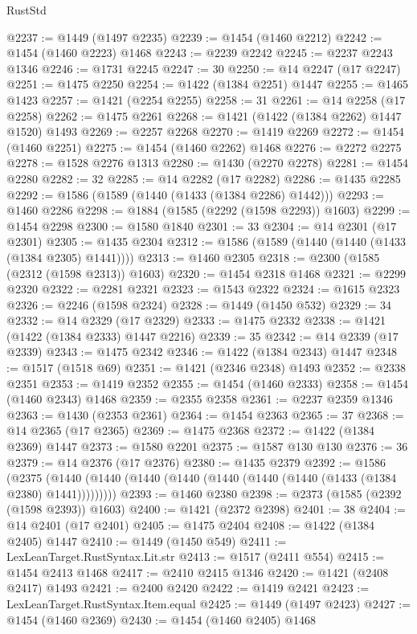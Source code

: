\begin{lexlean}{RustStd}
\begin{coremodule}
@2237 := @1449 (@1497 @2235)
@2239 := @1454 (@1460 @2212)
@2242 := @1454 (@1460 @2223) @1468
@2243 := @2239 @2242
@2245 := @2237 @2243 @1346
@2246 := @1731 @2245
@2247 := 30
@2250 := @14 @2247 (@17 @2247)
@2251 := @1475 @2250
@2254 := @1422 (@1384 @2251) @1447
@2255 := @1465 @1423
@2257 := @1421 (@2254 @2255)
@2258 := 31
@2261 := @14 @2258 (@17 @2258)
@2262 := @1475 @2261
@2268 := @1421 (@1422 (@1384 @2262) @1447 @1520) @1493
@2269 := @2257 @2268
@2270 := @1419 @2269
@2272 := @1454 (@1460 @2251)
@2275 := @1454 (@1460 @2262) @1468
@2276 := @2272 @2275
@2278 := @1528 @2276 @1313
@2280 := @1430 (@2270 @2278)
@2281 := @1454 @2280
@2282 := 32
@2285 := @14 @2282 (@17 @2282)
@2286 := @1435 @2285
@2292 := @1586 (@1589 (@1440 (@1433 (@1384 @2286) @1442)))
@2293 := @1460 @2286
@2298 := @1884 (@1585 (@2292 (@1598 @2293)) @1603)
@2299 := @1454 @2298
@2300 := @1580 @1840
@2301 := 33
@2304 := @14 @2301 (@17 @2301)
@2305 := @1435 @2304
@2312 := @1586 (@1589 (@1440 (@1440 (@1433 (@1384 @2305) @1441))))
@2313 := @1460 @2305
@2318 := @2300 (@1585 (@2312 (@1598 @2313)) @1603)
@2320 := @1454 @2318 @1468
@2321 := @2299 @2320
@2322 := @2281 @2321
@2323 := @1543 @2322
@2324 := @1615 @2323
@2326 := @2246 (@1598 @2324)
@2328 := @1449 (@1450 @532)
@2329 := 34
@2332 := @14 @2329 (@17 @2329)
@2333 := @1475 @2332
@2338 := @1421 (@1422 (@1384 @2333) @1447 @2216)
@2339 := 35
@2342 := @14 @2339 (@17 @2339)
@2343 := @1475 @2342
@2346 := @1422 (@1384 @2343) @1447
@2348 := @1517 (@1518 @69)
@2351 := @1421 (@2346 @2348) @1493
@2352 := @2338 @2351
@2353 := @1419 @2352
@2355 := @1454 (@1460 @2333)
@2358 := @1454 (@1460 @2343) @1468
@2359 := @2355 @2358
@2361 := @2237 @2359 @1346
@2363 := @1430 (@2353 @2361)
@2364 := @1454 @2363
@2365 := 37
@2368 := @14 @2365 (@17 @2365)
@2369 := @1475 @2368
@2372 := @1422 (@1384 @2369) @1447
@2373 := @1580 @2201
@2375 := @1587 @130 @130
@2376 := 36
@2379 := @14 @2376 (@17 @2376)
@2380 := @1435 @2379
@2392 := @1586
    (@2375 (@1440 (@1440 (@1440 (@1440 (@1440 (@1440 (@1440 (@1433 (@1384 @2380) @1441)))))))))
@2393 := @1460 @2380
@2398 := @2373 (@1585 (@2392 (@1598 @2393)) @1603)
@2400 := @1421 (@2372 @2398)
@2401 := 38
@2404 := @14 @2401 (@17 @2401)
@2405 := @1475 @2404
@2408 := @1422 (@1384 @2405) @1447
@2410 := @1449 (@1450 @549)
@2411 := LexLeanTarget.RustSyntax.Lit.str
@2413 := @1517 (@2411 @554)
@2415 := @1454 @2413 @1468
@2417 := @2410 @2415 @1346
@2420 := @1421 (@2408 @2417) @1493
@2421 := @2400 @2420
@2422 := @1419 @2421
@2423 := LexLeanTarget.RustSyntax.Item.equal
@2425 := @1449 (@1497 @2423)
@2427 := @1454 (@1460 @2369)
@2430 := @1454 (@1460 @2405) @1468

\end{coremodule}
\end{lexlean}
